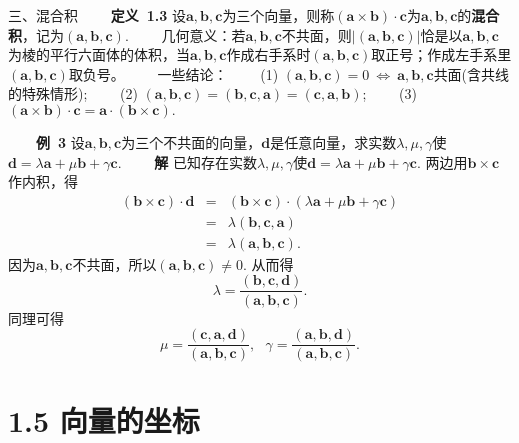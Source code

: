 \documentclass[compress,mathserif,cjk]{beamer}
\theoremstyle{remark}
\numberwithin{equation}{section}
\newcommand{\hei}{\bf}      %
\begin{document}
\begin{CJK}{UTF8}{gbsn}
\begin{frame}{三、混合积}
 \ \ \ \ {\hei 定义~1.3} 设$\bm a,\bm b ,\bm c$为三个向量，则称$(\bm a\times\bm b)\cdot\bm c$为$\bm a,\bm b ,\bm c$的{\hei 混合积}，记为$(\bm a,\bm b ,\bm c)$.
 \vskip 10pt
 \ \ \ \ 几何意义：若$\bm a,\bm b ,\bm c$不共面，则$|(\bm a,\bm b ,\bm c)|$恰是以$\bm a,\bm b ,\bm c$为棱的平行六面体的体积，当$\bm a,\bm b ,\bm c$作成右手系时$(\bm a,\bm b ,\bm c)$取正号；作成左手系里$(\bm a,\bm b ,\bm c)$取负号。
 \vskip 10pt
 \pause\ \ \ \ 一些结论：
 \vskip 5pt
 \ \ \ \ (1) $(\bm a,\bm b ,\bm c)=0~\Longleftrightarrow~\bm a,\bm b ,\bm c$共面(含共线的特殊情形);
 \vskip 5pt
 \ \ \ \ (2) $(\bm a,\bm b ,\bm c)=(\bm b ,\bm c,\bm a)=(\bm c,\bm a,\bm b)$;
 \vskip 5pt
 \ \ \ \ (3) $(\bm a\times\bm b)\cdot\bm c=\bm a\cdot(\bm b\times\bm c).$
\end{frame}

\begin{frame}
 \ \ \ \ {\hei 例~3} 设$\bm a,\bm b ,\bm c$为三个不共面的向量，$\bm d$是任意向量，求实数$\lambda,\mu,\gamma$使$\bm d=\lambda\bm a+\mu\bm b+\gamma\bm c$.
 \pause\vskip 10pt
 \ \ \ \ {\hei 解} 已知存在实数$\lambda,\mu,\gamma$使$\bm d=\lambda\bm a+\mu\bm b+\gamma\bm c.$
 两边用$\bm b\times\bm c$作内积，得
 \begin{eqnarray*}
 (\bm b\times\bm c)\cdot\bm d &=& (\bm b\times\bm c)\cdot(\lambda\bm a+\mu\bm b+\gamma\bm c) \\
 &=& \lambda(\bm b,\bm c,\bm a)\\
 &=& \lambda(\bm a,\bm b,\bm c).
 \end{eqnarray*}
 因为$\bm a,\bm b ,\bm c$不共面，所以$(\bm a,\bm b,\bm c)\neq0$. 从而得
 $$\lambda=\frac{(\bm b,\bm c,\bm d)}{(\bm a,\bm b,\bm c)}.$$
 同理可得
 $$\mu=\frac{(\bm c,\bm a,\bm d)}{(\bm a,\bm b,\bm c)},~~~\gamma=\frac{(\bm a,\bm b,\bm d)}{(\bm a,\bm b,\bm c)}.$$
\end{frame}
\section[1.5]{1.5 向量的坐标}


\end{CJK}
\end{document}
